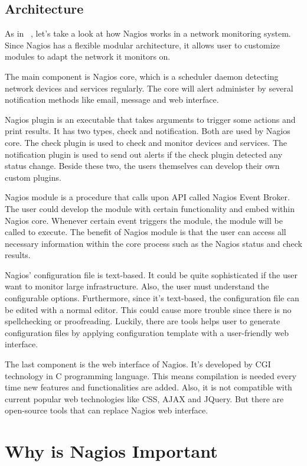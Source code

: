 \documentclass[9pt,twocolumn,twoside]{styles/osajnl}
\begin{document}
\subsection{Architecture}

As in ~\cite{nagios-paper-2012}, let's take a look at how Nagios works in a network monitoring system. Since Nagios has a flexible modular architecture, it allows user to customize modules to adapt the network it monitors on. 

The main component is Nagios core, which is a scheduler daemon detecting network devices and services regularly. The core will alert administer by several notification methods like email, message and web interface. 

Nagios plugin is an executable that takes arguments to trigger some actions and print results. It has two types, check and notification. Both are used by Nagios core. The check plugin is used to check and monitor devices and services. The notification plugin is used to send out alerts if the check plugin detected any status change. Beside these two, the users themselves can develop their own custom plugins. 

Nagios module is a procedure that calls upon API called Nagios Event Broker. The user could develop the module with certain functionality and embed within Nagios core. Whenever certain event triggers the module, the module will be called to execute. The benefit of Nagios module is that the user can access all necessary information within the core process such as the Nagios status and check results. 

Nagios' configuration file is text-based. It could be quite sophisticated if the user want to monitor large infrastructure. Also, the user must understand the configurable options. Furthermore, since it's text-based, the configuration file can be edited with a normal editor. This could cause more trouble since there is no spellchecking or proofreading. Luckily, there are tools helps user to generate configuration files by applying configuration template with a user-friendly web interface.

The last component is the web interface of Nagios. It's developed by CGI technology in C programming language. This means compilation is needed every time new features and functionalities are added. Also, it is not compatible with current popular web technologies like CSS, AJAX and JQuery.  But there are open-source tools that can replace Nagios web interface.

\section{Why is Nagios Important}
\end{document}
